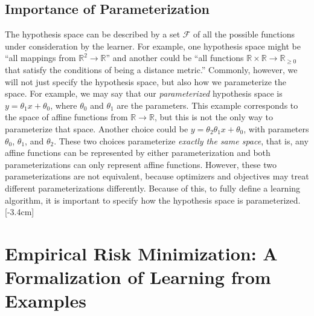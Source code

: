 \subsection{Importance of Parameterization} The hypothesis space can be described by a set $\mathcal{F}$ of all the possible functions under consideration by the learner. For example, one hypothesis space might be ``all mappings from $\mathbb{R}^2 \rightarrow \mathbb{R}$'' and another could be ``all functions $\mathbb{R} \times \mathbb{R} \rightarrow \mathbb{R}_{\geq 0}$ that satisfy the conditions of being a distance metric.'' Commonly, however, we will not just specify the hypothesis space, but also how we parameterize the space. For example, we may say that our \textit{parameterized} hypothesis space is $y = \theta_1 x + \theta_0$, where $\theta_0$ and $\theta_1$ are the parameters. This example corresponds to the space of affine functions from $\mathbb{R} \rightarrow \mathbb{R}$, but this is not the only way to parameterize that space. Another choice could be $y = \theta_2\theta_1 x + \theta_0$, with parameters $\theta_0$, $\theta_1$, and $\theta_2$. These two choices parameterize \textit{exactly the same space}, that is, any affine functions can be represented by either parameterization and both parameterizations can only represent affine functions. However, these two parameterizations are not equivalent, because optimizers and objectives may treat different parameterizations differently. Because of this, to fully define a learning algorithm, it is important to specify how the hypothesis space is parameterized.[-3.4cm]

\section{Empirical Risk Minimization: A Formalization of Learning from Examples}

